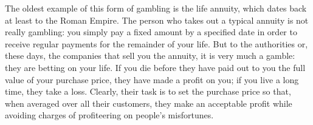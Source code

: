 The oldest example of this form of gambling is the life annuity, which dates back at least to the Roman Empire. The person who takes out a typical annuity is not really gambling: you simply pay a fixed amount by a specified date in order to receive regular payments for the remainder of your life. But to the authorities or, these days, the companies that sell you the annuity, it is very much a gamble: they are betting on your life. If you die before they have paid out to you the full value of your purchase price, they have made a profit on you; if you live a long time, they take a loss. Clearly, their task is to set the purchase price so that, when averaged over all their customers, they make an acceptable profit while avoiding charges of profiteering on people’s misfortunes.